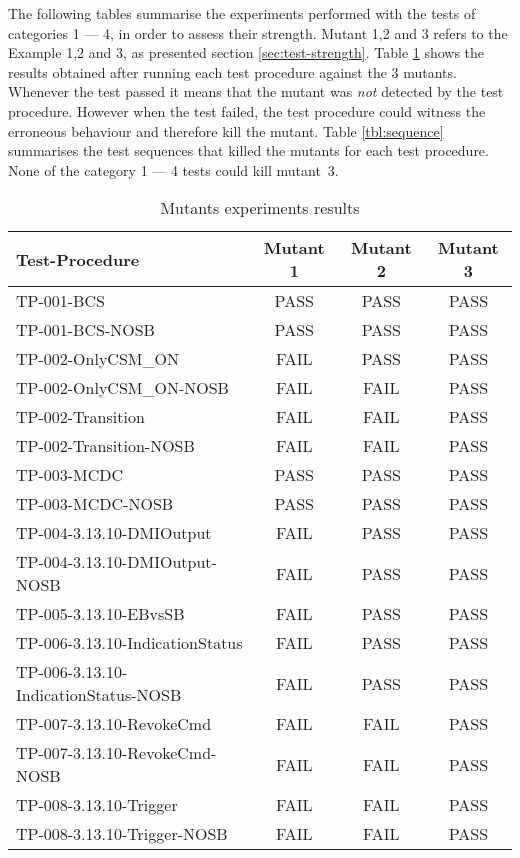The following tables summarise the experiments performed with the tests of categories 1 --- 4, in order to assess
their strength.   Mutant 1,2 and 
3 refers to the Example 1,2 and 3, as presented  section \ref{sec:test-strength}.
Table \ref{tbl:mutant} shows the results obtained after running  each
test procedure against the 3 mutants. Whenever the test passed it means
that the mutant was {\it not} detected by the test procedure. However when
the test failed, the test procedure could witness the erroneous
behaviour and therefore kill the
mutant. Table \ref{tbl:sequence} summarises the test sequences
that killed the mutants for each test procedure. None of the category 1 --- 4 tests could kill mutant~3.


\begin{table}[htbp]
\centering
\caption{\label{tbl:mutant}Mutants experiments results}
\begin{tabular}{|l|c|c|c|}\hline\hline
Test-Procedure&Mutant 1& Mutant 2& Mutant 3\\\hline
TP-001-BCS                & PASS & PASS & PASS \\\hline
TP-001-BCS-NOSB           & PASS & PASS & PASS \\\hline
TP-002-OnlyCSM\_ON        & \cellcolor{red!25}FAIL & PASS & PASS \\\hline
TP-002-OnlyCSM\_ON-NOSB   & \cellcolor{red!25}FAIL & \cellcolor{red!25}FAIL & PASS \\\hline
TP-002-Transition         & \cellcolor{red!25}FAIL & \cellcolor{red!25}FAIL & PASS \\\hline
TP-002-Transition-NOSB    & \cellcolor{red!25}FAIL
& \cellcolor{red!25}FAIL  & PASS \\\hline
TP-003-MCDC & PASS        & PASS & PASS \\\hline
TP-003-MCDC-NOSB          & PASS & PASS & PASS \\\hline
TP-004-3.13.10-DMIOutput         & \cellcolor{red!25}FAIL & PASS & PASS  \\\hline
TP-004-3.13.10-DMIOutput-NOSB    & \cellcolor{red!25}FAIL & PASS & PASS \\\hline
TP-005-3.13.10-EBvsSB & \cellcolor{red!25}FAIL & PASS & PASS \\\hline
TP-006-3.13.10-IndicationStatus & \cellcolor{red!25}FAIL & PASS &
PASS \\\hline
TP-006-3.13.10-IndicationStatus-NOSB & \cellcolor{red!25}FAIL & PASS & PASS \\\hline
TP-007-3.13.10-RevokeCmd & \cellcolor{red!25}FAIL
& \cellcolor{red!25}FAIL & PASS \\\hline
TP-007-3.13.10-RevokeCmd-NOSB & \cellcolor{red!25}FAIL & \cellcolor{red!25}FAIL & PASS \\\hline
TP-008-3.13.10-Trigger & \cellcolor{red!25}FAIL
& \cellcolor{red!25}FAIL & PASS \\\hline
TP-008-3.13.10-Trigger-NOSB & \cellcolor{red!25}FAIL & \cellcolor{red!25}FAIL & PASS \\\hline\hline
\end{tabular} 
\end{table}

